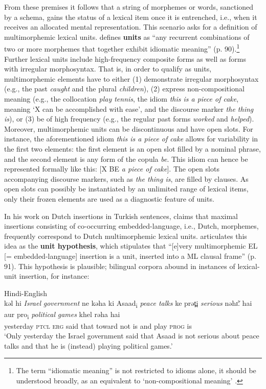 From these premises it follows that a string of morphemes or words, sanctioned by a schema, gains the status of a lexical item once it is entrenched, i.e., when it receives an allocated mental representation. This scenario asks for a definition of multimorphemic lexical units. \citet{backus-units-2003} defines \textbf{units} as ``any recurrent combinations of two or more morphemes that together exhibit idiomatic meaning'' (p. 90).\footnote{
The term ``idiomatic meaning'' is not restricted to idioms alone, it should be understood broadly, as an equivalent to `non-compositional meaning' \citep[cf.][86]{backus-units-2003}.} Further lexical units include high-frequency composite forms as well as forms with irregular morphosyntax. That is, in order to qualify as units, multimorphemic elements have to either (1) demonstrate irregular morphosyntax (e.g., the past \textit{caught} and the plural \textit{children}), (2) express non-compositional meaning (e.g., the collocation \textit{play tennis}, the idiom \textit{this is a piece of cake}, meaning `X can be accomplished with ease', and the discourse marker \textit{the thing is}), or (3) be of high frequency (e.g., the regular past forms \textit{worked} and \textit{helped}). Moreover, multimorphemic units can be discontinuous and have open slots. For instance, the aforementioned idiom \textit{this is a piece of cake} allows for variability in the first two elements: the first element is an open slot filled by a nominal phrase, and the second element is any form of the copula \textit{be}. This idiom can hence be represented formally like this: [X BE \textit{a piece of cake}]. The open slots accompanying discourse markers, such as \textit{the thing is}, are filled by clauses. As open slots can possibly be instantiated by an unlimited range of lexical items, only their frozen elements are used as a diagnostic feature of units.

In his work on Dutch insertions in Turkish sentences, \citet{backus-evidence-1999} claims that maximal insertions consisting of co-occurring embedded-language, i.e., Dutch, morphemes, frequently correspond to Dutch multimorphemic lexical units. \citet{backus-units-2003} articulates this idea as the \textbf{unit hypothesis}, which stipulates that ``[e]very multimorphemic EL [= embedded-language] insertion is a unit, inserted into a ML clausal frame'' (p. 91). This hypothesis is plausible; bilingual corpora abound in instances of lexical-unit insertion, for instance:

\ea \label{ex:1:16}
Hindi-English \citep[228]{bhatt-1997}\\
\gll kəl hi \textit{Israel} \textit{government} ne kəha ki Asaad\textsubscript{i} \textit{peace talks} ke prət̪i \textit{serious} nəhɪ̃ː hai aur pro\textsubscript{i} \textit{political} \textit{games} khel rəha hai\\
yesterday \textsc{ptcl} {} {} \textsc{erg} said that {} {} {} toward {} not is and {} {} {} play \textsc{prog} is\\
\glt `Only yesterday the Israel government said that Asaad is not serious about peace talks and that he is (instead) playing political games.'
\z

